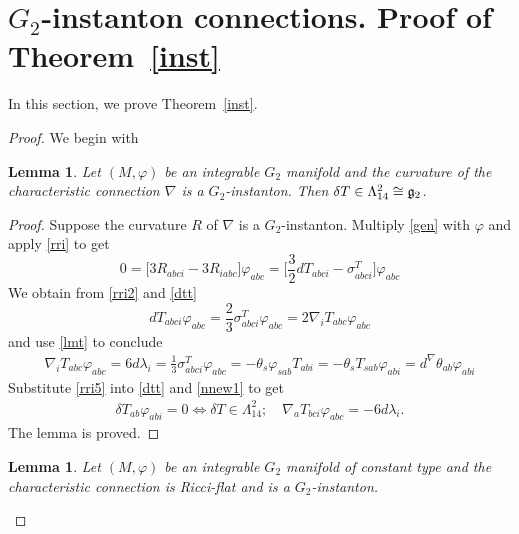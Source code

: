 \documentclass[10pt,british]{article}
\newtheorem{lemma}[thrm]{Lemma}
\def\sb {{\nabla}}
\def\p{{\varphi}}
\def\ph{{\Phi}}
\begin{document}
\section{$G_2$-instanton connections. Proof of Theorem~\ref{inst}}
In this section, we prove Theorem~\ref{inst}.
\begin{proof}
We begin with
\begin{lemma}
Let $(M,\p)$ be  an integrable $G_2$ manifold and the  curvature of the characteristic  connection $\sb$   is a $G_2$-instanton. Then  $\delta T\in\Lambda^2_{14}\cong  \frak{g}_2$.%
\end{lemma}
\begin{proof}
Suppose the curvature $R$ of $\sb$ is a $G_2$-instanton. %
Multiply \eqref{gen} with  $\p$ and  apply  \eqref{rri} to get
\begin{equation}\label{rri2}
0=\Big[3R_{abci}-3R_{iabc}\Big]\p_{abc}=\Big[\frac32dT_{abci}-\sigma^T_{abci}\Big]\p_{abc}
\end{equation}
We obtain from \eqref{rri2} and  \eqref{dtt} 
$$%
dT_{abci}\p_{abc}=\frac23\sigma^T_{abci}\p_{abc}=2\sb_iT_{abc}\p_{abc}
$$ %
and use \eqref{lmt} to conclude 
\begin{equation}\label{rri5}
\begin{split}
\sb_iT_{abc}\p_{abc}=6d\lambda_i=\frac13\sigma^T_{abci}\p_{abc}=-\theta_s\p_{sab}T_{abi}=-\theta_sT_{sab}\p_{abi}=d^{\sb}\theta_{ab}\p_{abi}%
\end{split}
\end{equation}
Substitute \eqref{rri5} into \eqref{dtt} and \eqref{nnew1} to get
\begin{equation}\label{rri6}
\begin{split}
\delta T_{ab}\p_{abi}=0 \Leftrightarrow \delta T\in\Lambda^2_{14};\quad \sb_aT_{bci}\p_{abc}=-6d\lambda_i.
\end{split}
\end{equation}
The lemma is proved.
\end{proof}
\begin{lemma}\label{sbthetain}
Let $(M,\p)$ be  an integrable $G_2$ manifold  of constant type and the  characteristic  connection   is Ricci-flat and  is a $G_2$-instanton.


\end{lemma}
\end{proof}
\end{document}
